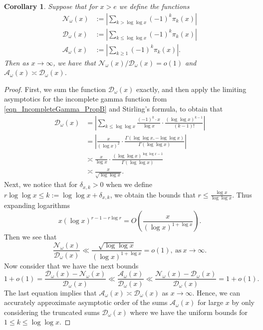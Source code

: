 \documentclass[11pt,reqno,a4letter]{article}
\numberwithin{figure}{section}
\numberwithin{table}{section}
\theoremstyle{plain}
\newtheorem{cor}[theorem]{Corollary}
\numberwithin{theorem}{section}
\theoremstyle{definition}
\begin{document}
\begin{cor}
\label{cor_AsymptoticsForSignedSumsOfomegan_v1} 
Suppose that for $x > e$ we define the functions 
\begin{align*} 
\mathcal{N}_{\omega}(x) & := \left\lvert \sum_{k > \log\log x} (-1)^{k} \pi_k(x) \right\rvert \\ 
\mathcal{D}_{\omega}(x) & := \left\lvert \sum_{k \leq \log\log x} (-1)^{k} \pi_k(x) \right\rvert \\ 
\mathcal{A}_{\omega}(x) & := \left\lvert \sum_{k \geq 1} (-1)^{k} \pi_k(x) \right\rvert. 
\end{align*} 
Then as $x \rightarrow \infty$, we have that $\mathcal{N}_{\omega}(x) / \mathcal{D}_{\omega}(x) = o(1)$ 
and $\mathcal{A}_{\omega}(x) \asymp \mathcal{D}_{\omega}(x)$. 
\end{cor} 
\begin{proof} 
First, we sum the function $\mathcal{D}_{\omega}(x)$ exactly, and then apply the limiting 
asymptotics for the incomplete gamma function from 
\eqref{eqn_IncompleteGamma_PropB} and Stirling's formula, to obtain that 
\begin{align*} 
\mathcal{D}_{\omega}(x) & = \left\lvert \sum_{k \leq \log\log x} \frac{(-1)^k \cdot x}{\log x} \cdot 
     \frac{(\log\log x)^{k-1}}{(k-1)!} \right\rvert \\ 
     & = \left\lvert \frac{x}{(\log x)^2} \cdot \frac{\Gamma(\log\log x, -\log\log x)}{ 
     \Gamma(\log\log x)} \right\rvert \\ 
     & \asymp \frac{x}{\log x} \cdot \frac{(\log\log x)^{\log\log x - 1}}{\Gamma(\log\log x)} \\ 
     & \asymp \frac{x}{\sqrt{\log\log x}}. 
\end{align*} 
Next, we notice that for $\delta_{x,k} > 0$ when we define 
$r\log\log x \leq k := \log\log x + \delta_{x,k}$, we obtain the bounds that 
$r \leq \frac{\log x}{\log\log x}$. Thus expanding logarithms 
\[
x (\log x)^{r - 1 - r \log r} = O\left(\frac{x}{(\log x)^{1 + \log x}}\right). 
\]
Then we see that 
\[
\frac{\mathcal{N}_{\omega}(x)}{\mathcal{D}_{\omega}(x)} \ll 
     \frac{\sqrt{\log\log x}}{(\log x)^{1 + \log x}} = o(1), 
     \mathrm{\ as\ } x \rightarrow \infty. 
\]
Now consider that we have the next bounds 
\[
1+o(1) = \frac{\mathcal{D}_{\omega}(x)-\mathcal{N}_{\omega}(x)}{\mathcal{D}_{\omega}(x)} \ll 
     \frac{\mathcal{A}_{\omega}(x)}{\mathcal{D}_{\omega}(x)} \ll 
     \frac{\mathcal{N}_{\omega}(x)-\mathcal{D}_{\omega}(x)}{\mathcal{D}_{\omega}(x)} = 
     1 + o(1). 
\]
The last equation implies that 
$\mathcal{A}_{\omega}(x) \asymp \mathcal{D}_{\omega}(x)$ as $x \rightarrow \infty$. 
Hence, we can accurately approximate asymptotic order of 
the sums $\mathcal{A}_{\omega}(x)$ for large $x$ by only considering the truncated sums 
$\mathcal{D}_{\omega}(x)$ where we have the uniform bounds for 
$1 \leq k \leq \log\log x$. 
\end{proof} 
\end{document}
